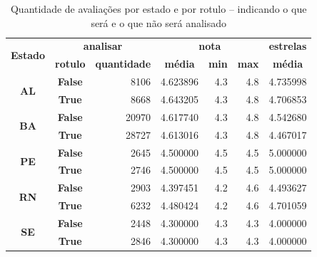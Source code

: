 \begin{table}[]
	\centering
	\begin{tabular}{|c|crrrrr|}
		\hline
		\multicolumn{1}{|c|}{\multirow{2}{*}{\textbf{Estado}}} &
		\multicolumn{2}{c|}{\textbf{analisar}}                 &
		\multicolumn{3}{c|}{\textbf{nota}}                     &
		\multicolumn{1}{c|}{\textbf{estrelas}}                                                                            \\ \cline{2-7}
		\multicolumn{1}{|l|}{}                                 &
		\multicolumn{1}{c}{\textbf{rotulo}}                    &
		\multicolumn{1}{c|}{\textbf{quantidade}}               &
		\multicolumn{1}{c}{\textbf{média}}                     &
		\multicolumn{1}{c}{\textbf{min}}                       &
		\multicolumn{1}{c|}{\textbf{max}}                      &
		\multicolumn{1}{c|}{\textbf{média}}                                                                               \\ \hline
		\multirow{2}{*}{\textbf{AL}}                           & \textbf{False} & 8106  & 4.623896 & 4.3 & 4.8 & 4.735998 \\
		                                                       & \textbf{True}  & 8668  & 4.643205 & 4.3 & 4.8 & 4.706853 \\ \hline
		\multirow{2}{*}{\textbf{BA}}                           & \textbf{False} & 20970 & 4.617740 & 4.3 & 4.8 & 4.542680 \\
		                                                       & \textbf{True}  & 28727 & 4.613016 & 4.3 & 4.8 & 4.467017 \\ \hline
		\multirow{2}{*}{\textbf{PE}}                           & \textbf{False} & 2645  & 4.500000 & 4.5 & 4.5 & 5.000000 \\
		                                                       & \textbf{True}  & 2746  & 4.500000 & 4.5 & 4.5 & 5.000000 \\ \hline
		\multirow{2}{*}{\textbf{RN}}                           & \textbf{False} & 2903  & 4.397451 & 4.2 & 4.6 & 4.493627 \\
		                                                       & \textbf{True}  & 6232  & 4.480424 & 4.2 & 4.6 & 4.701059 \\ \hline
		\multirow{2}{*}{\textbf{SE}}                           & \textbf{False} & 2448  & 4.300000 & 4.3 & 4.3 & 4.000000 \\
		                                                       & \textbf{True}  & 2846  & 4.300000 & 4.3 & 4.3 & 4.000000 \\ \hline
	\end{tabular}\caption{Quantidade de avaliações por estado e por rotulo -- indicando o que será e o que não será analisado}
	\label{table:distribuicao_review_por_estado}
\end{table}

